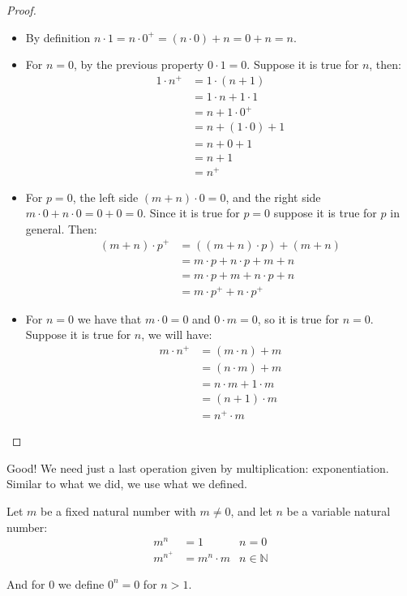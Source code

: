 \documentclass{tufte-handout}
\begin{document}
\begin{proof}
\begin{itemize}
		\item By definition $n \cdot 1 = n \cdot 0^+ = (n \cdot 0) + n = 0 + n = n$.
		\item For $n = 0$, by the previous property $0 \cdot 1 = 0$. Suppose it is true for $n$, then:
		\begin{align*}
			1 \cdot n^+ &= 1 \cdot (n + 1)\\
			&= 1 \cdot n + 1 \cdot 1\\
			&= n + 1 \cdot 0^+\\
			&= n + (1 \cdot 0) + 1\\
			&= n + 0 + 1\\
			&= n + 1\\
			&= n^+
		\end{align*}

		\item For $p = 0$, the left side $(m + n) \cdot 0 = 0$, and the right side $m \cdot 0+ n\cdot 0 = 0 + 0 = 0$. Since it is true for $p = 0$ suppose it is true for $p$ in general. Then:
		\begin{align*}
			(m + n) \cdot p^+ &= ((m + n) \cdot p) + (m + n)\\
			&= m\cdot p + n \cdot p + m + n\\
			&= m\cdot p + m + n \cdot p + n\\
			&= m\cdot p^+ + n\cdot p^+
		\end{align*}

		\item For $n = 0$ we have that $m \cdot 0 = 0$ and $0 \cdot m = 0$, so it is true for $n = 0$. Suppose it is true for $n$, we will have:
		\begin{align*}
			m \cdot n^+ &= (m \cdot n) + m\\
			&= (n \cdot m) + m\\
			&= n \cdot m + 1 \cdot m\\
			&= (n + 1) \cdot m\\
			&= n^+ \cdot m
		\end{align*}
	\end{itemize}
\end{proof}

Good! We need just a last operation given by multiplication: exponentiation. Similar to what we did, we use what we defined.

\begin{definition}
	Let $m$ be a fixed natural number with $m \neq 0$, and let $n$ be a variable natural number:
	\begin{align*}
		m^n &= 1 & n = 0\\
		m^{n^+} &= m^n \cdot m & n \in \mathbb{N}
	\end{align*} 

	And for $0$ we define $0^n = 0$ for $n > 1$.
\end{definition}
\end{document}
